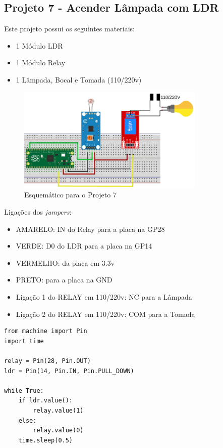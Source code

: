 \documentclass[a4paper,11pt]{article}
\begin{document}
\subsection{Projeto 7 - Acender Lâmpada com LDR}

Este projeto possui os seguintes materiais: \vspace{-1em}
\begin{itemize}
	\item 1 Módulo LDR
	\item 1 Módulo Relay
	\item 1 Lâmpada, Bocal e Tomada (110/220v)
\end{itemize}

\begin{figure}[H]
	\centering
	\includegraphics[width=0.8\textwidth]{imagem/PicoProj7}
	\caption{Esquemático para o Projeto 7}
\end{figure}

Ligações dos \textit{jumpers}: \vspace{-1em}
\begin{itemize}
	\item AMARELO: IN do Relay para a placa na GP28
	\item VERDE: D0 do LDR para a placa na GP14
	\item VERMELHO: da placa em 3.3v
	\item PRETO: para a placa na GND
	\item Ligação 1 do RELAY em 110/220v: NC para a Lâmpada
	\item Ligação 2 do RELAY em 110/220v: COM para a Tomada
\end{itemize}

\begin{lstlisting}
from machine import Pin
import time

relay = Pin(28, Pin.OUT)
ldr = Pin(14, Pin.IN, Pin.PULL_DOWN)

while True:
	if ldr.value():
		relay.value(1)
	else:
		relay.value(0)
	time.sleep(0.5)
\end{lstlisting}
\end{document}

